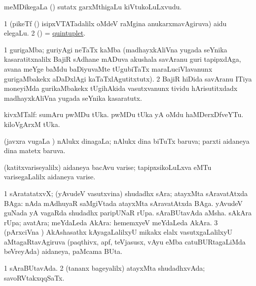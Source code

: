 \bentry
{}
\gl{\nA}
\bmng
meMDikegaLa () sutatx garxMthigaLu kiVtukoLuLxvudu. 
\emng
\eentry

\bentry
{}
\gl{\nA}
\bmng
\bnum
\num{1} (pikeTf () isipxVTATadalilx oMdeV raMgina anukarxmavAgiruva) aidu elegaLu. 
\num{2} (\ame) = \hyperlink{quintuplet}{quintuplet}. 
\enum
\emng
\eentry

\bentry
{}
\gl{\nA}
\expl{(\ca)}
\bmng
\bnum
\num{1} gurigaMba; guriyAgi neTaTx kaMba (madhayxkAliVna yugada seYnika kasaratitxnalilx BajiR sAdhane mADuva akushala savAranu guri tapipxdAga, avana meYge baMdu baDiyuvaMte tUgubiTaTx maraLuciVlavanunx gurigaMbakekx aDaDxlAgi kaTaTxlAgutitxtutx). 
\num{2} BajiR hiDida savAranu ITiya moneyiMda gurikaMbakekx tUgihAkida vasutxvanunx tividu hArisutitxdadx madhayxkAliVna yugada seYnika kasaratutx.  
\enum
\emng
\eentry

\bentry
{}
\gl{\nA}
\bmng
kivxMTalf: 
\banum
{} sumAru  pwMDu tUka. 
  pwMDu tUka yA oMdu haMDerxDfveYTu. 
  kiloVgArxM tUka. 
\eanum
\emng
\eentry

\bentry
{}
\gl{\gu}
\bmng
(javxra \mo vugaLa \vi) nAlukx dinagaLa; nAlukx dina biTuTx baruva; parxti aidaneya dina matetx baruva. 
\emng
\eentry

\bentry
{}
\gl{\nA}
\bmng
(katitxvariseyalilx) aidaneya bacAvu varise; tapipxsikoLuLxva eMTu varisegaLalilx aidaneya varise. 
\emng
\eentry

\bentry
{}
\gl{\nA}
\bmng
\bnum
\num{1} sAratatatxvX; (yAvudeV vasutxvina) shudadhx sAra; atayxMta sAravatAtxda BAga:    nAda mAdhuyaR saMgiVtada atayxMta sAravatAtxda BAga. 
 yAvudeV guNada yA vagaRda 
\banum
{} shudadhx paripUNaR rUpa. 
 sAraBUtavAda aMsha. 
 sAkAra rUpa; avatAra; meYdaLeda AkAra:    hememxyeV meYdaLeda AkAra. 
\eanum
\numie
\num{3} (pArxciVna \tashA) AkAshasathx kAyagaLalilxyU mikakx elalx vasutxgaLalilxyU aMtagaRtavAgiruva (paqthivx, apf, teVjasusx, vAyu eMba catuBURtagaLiMda beVreyAda) aidaneya, paMcama BUta. 
\enum
\emng
\eentry

\bentry
{}
\gl{\gu}
\bmng
\bnum
\num{1} sAraBUtavAda. 
\num{2} (tananx bageyalilx) atayxMta shudadhxvAda; savoRVtakxqqSaTx. 
\enum
\emng
\eentry

